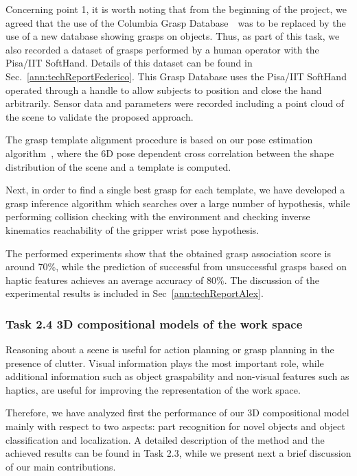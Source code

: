\documentclass[a4paper,11pt,pdf]{pacmanreport}
\begin{document}
Concerning point 1, it is worth noting that from the beginning of the project, we agreed that the use of the Columbia Grasp Database~\ was to be replaced by the use of a new database showing grasps on objects. Thus, as part of this task, we also recorded a dataset of grasps performed by a human operator with the Pisa/IIT SoftHand. Details of this dataset can be found in Sec.~\ref{ann:techReportFederico}. This Grasp Database uses the Pisa/IIT SoftHand operated through a handle to allow subjects to position and close the hand arbitrarily. Sensor data and parameters were recorded including a point cloud of the scene to validate the proposed approach.

The grasp template alignment procedure is based on our pose estimation algorithm~\cite{detry2010ac}, where the 6D pose dependent cross correlation between the shape distribution of the scene and a template is computed.

Next, in order to find a single best grasp for each template, we have developed a grasp inference algorithm which searches over a large number of hypothesis, while performing collision checking with the environment and checking inverse kinematics reachability of the gripper wrist pose hypothesis.

The performed experiments show that the obtained grasp association score is around 70\%, 
while the prediction of successful from unsuccessful grasps based on haptic 
features achieves an average accuracy of 80\%. The discussion of the 
experimental results is included in Sec~\ref{ann:techReportAlex}.

\subsubsection{Task 2.4 3D compositional models of the work space}

Reasoning about a scene is useful for action planning or grasp planning in the presence of clutter. Visual information plays the most important role, while additional information such as object graspability and non-visual features such as haptics, are useful for improving the representation of the work space.

Therefore, we have analyzed first the performance of our 3D compositional model mainly with respect to two aspects: part recognition for novel objects and object classification and localization. A detailed description of the method and the achieved results can be found in Task 2.3, while we present next a brief discussion of our main contributions.
\end{document}
